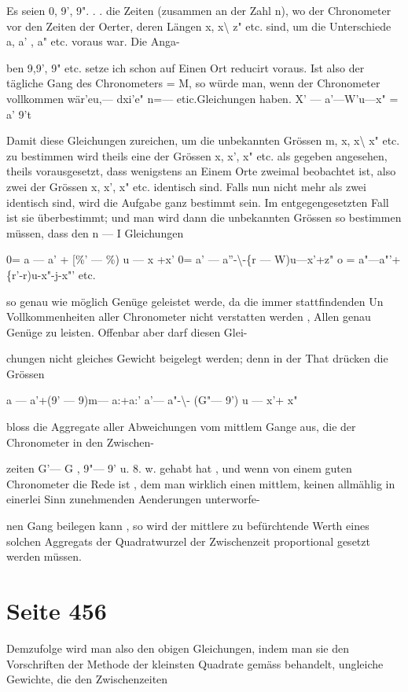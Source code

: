 \documentclass[10pt,a4paper]{article}
\begin{document}
Es seien 0, 9', 9". . . die Zeiten (zusammen an der Zahl n), wo der Chronometer vor den Zeiten der Oerter, deren Längen x, x\textbackslash{} z" etc. sind, um die Unterschiede a, a' , a" etc. voraus war. Die Anga-

ben 9,9', 9" etc. setze ich schon auf Einen Ort reducirt voraus. Ist also der tägliche Gang des Chronometers = M, so würde man, wenn der Chronometer vollkommen wär'eu,— dxi'e" n=— etic.Gleichungen haben. X' — a'—W'u—x" = a' 9't

Damit diese Gleichungen zureichen, um die unbekannten Grössen m, x, x\textbackslash{} x" etc. zu bestimmen wird theils eine der Grössen x, x', x" etc. als gegeben angesehen, theils vorausgesetzt, dass wenigstens an Einem Orte zweimal beobachtet ist, also zwei der Grössen x, x', x" etc. identisch sind. Falls nun nicht mehr als zwei identisch sind, wird die Aufgabe ganz bestimmt sein. Im entgegengesetzten Fall ist sie überbestimmt; und man wird dann die unbekannten Grössen so bestimmen müssen, dass den n — I Gleichungen

0= a — a' + [\%' — \%) u — x +x' 0= a' — a''-\textbackslash{}-\{r — W)u—x'+z" o = a"—a"'+\{r'-r)u-x"-j-x"' etc.

so genau wie möglich Genüge geleistet werde, da die immer stattfindenden Un Vollkommenheiten aller Chronometer nicht verstatten werden , Allen genau Genüge zu leisten. Offenbar aber darf diesen Glei-

chungen nicht gleiches Gewicht beigelegt werden; denn in der That drücken die Grössen

a — a'+(9' — 9)m— a:+a:' a'— a"-\textbackslash{}- (G"— 9') u — x'+ x"

bloss die Aggregate aller Abweichungen vom mittlem Gange aus, die der Chronometer in den Zwischen-

zeiten G'— G , 9"— 9' u. 8. w. gehabt hat , und wenn von einem guten Chronometer die Rede ist , dem man wirklich einen mittlem, keinen allmählig in einerlei Sinn zunehmenden Aenderungen unterworfe-

nen Gang beilegen kann , so wird der mittlere zu befürchtende Werth eines solchen Aggregats der Quadratwurzel der Zwischenzeit proportional gesetzt werden müssen.


\newpage
\section*{Seite 456}
Demzufolge wird man also den obigen Gleichungen, indem man sie den Vorschriften der Methode der kleinsten Quadrate gemäss behandelt, ungleiche Gewichte, die den Zwischenzeiten
\end{document}
